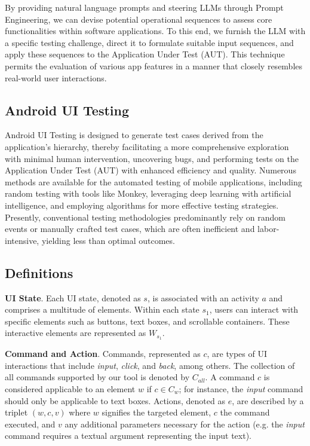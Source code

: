 \documentclass[conference]{IEEEtran}
\begin{document}
By providing natural language prompts and steering LLMs through Prompt Engineering, we can devise potential operational sequences to assess core functionalities within software applications. To this end, we furnish the LLM with a specific testing challenge, direct it to formulate suitable input sequences, and apply these sequences to the Application Under Test (AUT). This technique permits the evaluation of various app features in a manner that closely resembles real-world user interactions.

\subsection{Android UI Testing}
Android UI Testing is designed to generate test cases derived from the application's hierarchy, thereby facilitating a more comprehensive exploration with minimal human intervention, uncovering bugs, and performing tests on the Application Under Test (AUT) with enhanced efficiency and quality. Numerous methods are available for the automated testing of mobile applications, including random testing with tools like Monkey, leveraging deep learning with artificial intelligence, and employing algorithms for more effective testing strategies. Presently, conventional testing methodologies predominantly rely on random events or manually crafted test cases, which are often inefficient and labor-intensive, yielding less than optimal outcomes.


\subsection{Definitions}    %

\textbf{UI State}. Each UI state, denoted as $s$, is associated with an activity $a$ and comprises a multitude of elements. Within each state $s_1$, users can interact with specific elements such as buttons, text boxes, and scrollable containers. These interactive elements are represented as $W_{s_{1}}$.

\textbf{Command and Action}. Commands, represented as $c$, are types of UI interactions that include \textit{input}, \textit{click}, and \textit{back}, among others. The collection of all commands supported by our tool is denoted by $C_{all}$. A command $c$ is considered applicable to an element $w$ if $c \in C_w$; for instance, the \textit{input} command should only be applicable to text boxes. Actions, denoted as $e$, are described by a triplet $(w, c, v)$ where $w$ signifies the targeted element, $c$ the command executed, and $v$ any additional parameters necessary for the action (e.g. the \textit{input} command requires a textual argument representing the input text).
\end{document}
